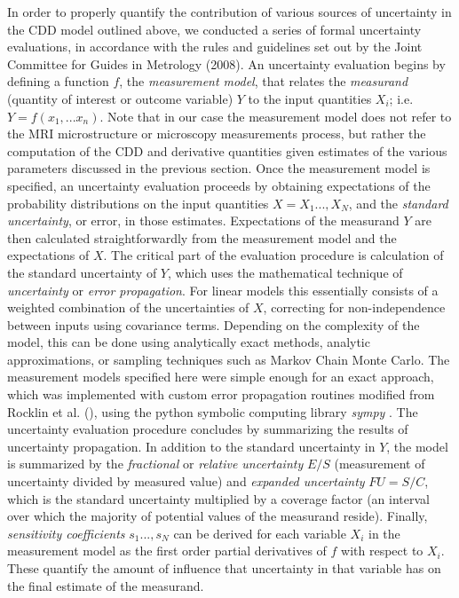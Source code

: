 In order to properly quantify the contribution of various sources of uncertainty in the CDD model outlined above, we conducted a series of formal uncertainty evaluations, in accordance with the rules and guidelines set out by the Joint Committee for Guides in Metrology (2008). An uncertainty evaluation begins by defining a function $f$, the \textit{measurement model}, that relates the \textit{measurand} (quantity of interest or outcome variable) $Y$ to the input quantities $X_{i}$; i.e. $Y = f(x_{1},...x_{n})$. Note that in our case the measurement model does not refer to the MRI microstructure or microscopy measurements process, but rather the computation of the CDD and derivative quantities given estimates of the various parameters discussed in the previous section. Once the measurement model is specified,
an uncertainty evaluation proceeds by obtaining expectations of the
probability distributions on the input quantities $X=X_{1}...,X_{N}$,
and the \emph{standard uncertainty}, or error, in those estimates. Expectations of the measurand $Y$ are then calculated straightforwardly from the measurement model and the expectations of $X$. The critical
part of the evaluation procedure is calculation of the standard
uncertainty of $Y$, which uses the mathematical technique of \emph{uncertainty} or \emph{error propagation}. For linear models this essentially consists of a weighted combination of the uncertainties of $X$, correcting for non-independence between inputs using covariance terms. Depending on the complexity of the model, this can be done using
analytically exact methods, analytic approximations, or sampling techniques such as Markov Chain Monte Carlo. The measurement models specified here were simple enough for an exact approach, which was implemented with custom error propagation routines modified from Rocklin et al. (), using the python symbolic computing library \textit{sympy} \cite{meurer2017sympy}. The uncertainty evaluation procedure concludes by summarizing the results of uncertainty propagation. In addition to the standard uncertainty in $Y$, the model is summarized by the \emph{fractional} or \emph{relative uncertainty} $E/S$ (measurement of uncertainty divided by measured value) and \emph{expanded uncertainty} $FU=S/C$, which is the standard uncertainty multiplied by a coverage factor (an interval over which the majority of potential values of the measurand reside). Finally, \emph{sensitivity coefficients} $s_{1}...,s_{N}$ can be derived for each variable $X_{i}$ in the measurement model as the first order partial derivatives of $f$ with respect to $X_{i}$. These quantify the amount of influence that uncertainty in that variable has on the final estimate of the measurand.



